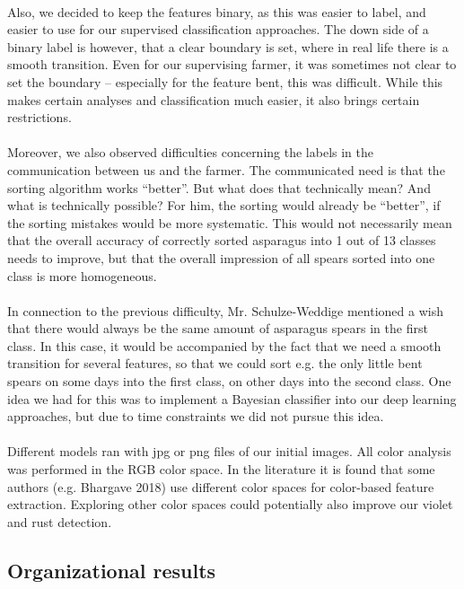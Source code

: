 \\
Also, we decided to keep the features binary, as this was easier to label, and easier to use for our supervised classification approaches. The down side of a binary label is however, that a clear boundary is set, where in real life there is a smooth transition. Even for our supervising farmer, it was sometimes not clear to set the boundary – especially for the feature bent, this was difficult. While this makes certain analyses and classification much easier, it also brings certain restrictions. \\
\\
Moreover, we also observed difficulties concerning the labels in the communication between us and the farmer. The communicated need is that the sorting algorithm works “better”. But what does that technically mean? And what is technically possible? For him, the sorting would already be “better”, if the sorting mistakes would be more systematic. This would not necessarily mean that the overall accuracy of correctly sorted asparagus into 1 out of 13 classes needs to improve, but that the overall impression of all spears sorted into one class is more homogeneous. \\
\\
In connection to the previous difficulty, Mr. Schulze-Weddige mentioned a wish that there would always be the same amount of asparagus spears in the first class. In this case, it would be accompanied by the fact that we need a smooth transition for several features, so that we could sort e.g. the only little bent spears on some days into the first class, on other days into the second class. One idea we had for this was to implement a Bayesian classifier into our deep learning approaches, but due to time constraints we did not pursue this idea. \\
\\
Different models ran with jpg or png files of our initial images. All color analysis was performed in the RGB color space. In the literature it is found that some authors (e.g. Bhargave 2018) use different color spaces for color-based feature extraction. Exploring other color spaces could potentially also improve our violet and rust detection. 




\subsection{Organizational results}

